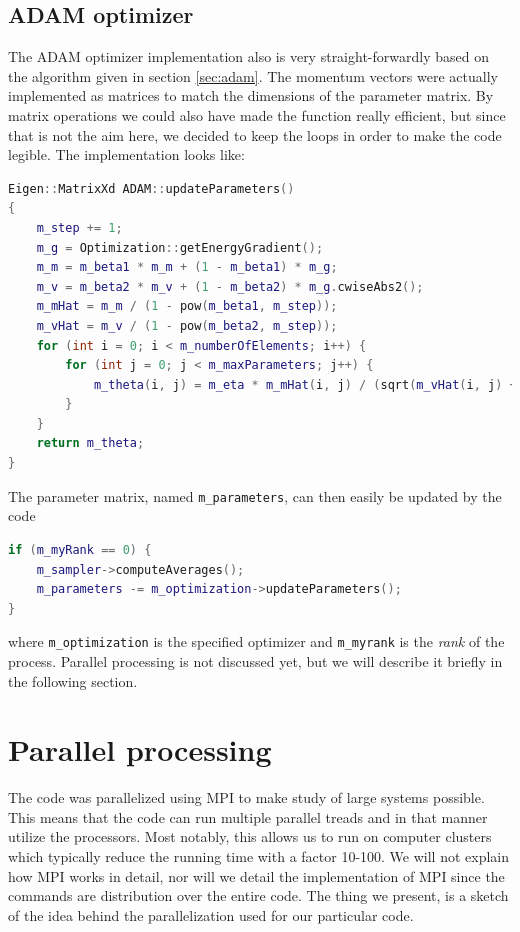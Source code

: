 \subsection{ADAM optimizer}
The ADAM optimizer implementation also is very straight-forwardly based on the algorithm given in section \ref{sec:adam}. The momentum vectors were actually implemented as matrices to match the dimensions of the parameter matrix. By matrix operations we could also have made the function really efficient, but since that is not the aim here, we decided to keep the loops in order to make the code legible. The implementation looks like:
\begin{lstlisting}[language=c++,caption={Taken from \lstinline{adam.cpp}.}]
Eigen::MatrixXd ADAM::updateParameters()
{
	m_step += 1;
	m_g = Optimization::getEnergyGradient();
	m_m = m_beta1 * m_m + (1 - m_beta1) * m_g;
	m_v = m_beta2 * m_v + (1 - m_beta2) * m_g.cwiseAbs2();
	m_mHat = m_m / (1 - pow(m_beta1, m_step));
	m_vHat = m_v / (1 - pow(m_beta2, m_step));
	for (int i = 0; i < m_numberOfElements; i++) {
		for (int j = 0; j < m_maxParameters; j++) {
			m_theta(i, j) = m_eta * m_mHat(i, j) / (sqrt(m_vHat(i, j) + m_epsilon));
		}
	}
	return m_theta;
}
\end{lstlisting}

The parameter matrix, named \lstinline|m_parameters|, can then easily be updated by the code
\begin{lstlisting}[language=c++,caption={Taken from \lstinline{system.cpp}.}]
if (m_myRank == 0) {
	m_sampler->computeAverages();
	m_parameters -= m_optimization->updateParameters();
}
\end{lstlisting}
where \lstinline|m_optimization| is the specified optimizer and \lstinline|m_myrank| is the \textit{rank} of the process. Parallel processing is not discussed yet, but we will describe it briefly in the following section.

\section{Parallel processing}
The code was parallelized using MPI to make study of large systems possible. This means that the code can run multiple parallel treads and in that manner utilize the processors. Most notably, this allows us to run on computer clusters which typically reduce the running time with a factor 10-100. We will not explain how MPI works in detail, nor will we detail the implementation of MPI since the commands are distribution over the entire code. The thing we present, is a sketch of the idea behind the parallelization used for our particular code.


